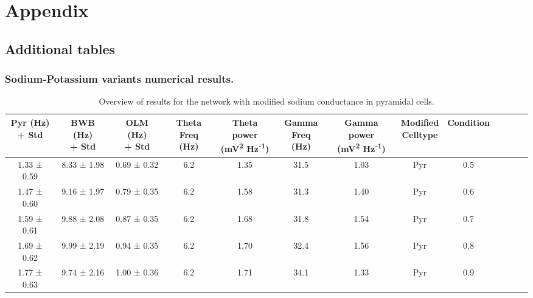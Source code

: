 \chapter{Appendix}\label{ch:appendix_b}

\section{Additional tables}
\subsection{Sodium-Potassium variants numerical results.}
\begin{table}[htbp]
    \caption[Sodium variant: Pyramidal cell]{Overview of results for the network with modified sodium conductance in pyramidal cells.}\label{table:NA_variant_pyr}
    \begin{adjustbox}{width=\textwidth}
        \begin{tabular}{ccccccccccccc}
            \hline
            \CellWithForcedBreak{Pyr (Hz)                                                  \\ + Std} & \CellWithForcedBreak{BWB (Hz) \\ + Std} & \CellWithForcedBreak{OLM (Hz) \\ + Std} & \CellWithForcedBreak{Theta \\ Freq (Hz)} & \CellWithForcedBreak{Theta power \\ (mV\textsuperscript{2} Hz\textsuperscript{-1})} & \CellWithForcedBreak{Gamma \\ Freq (Hz)} & \CellWithForcedBreak{Gamma power \\ (mV\textsuperscript{2} Hz\textsuperscript{-1})} & \CellWithForcedBreak{Modified \\ Celltype} & Condition \\
            \hline
            1.33 ± 0.59 & 8.33 ± 1.98 & 0.69 ± 0.32 & 6.2 & 1.35 & 31.5 & 1.03 & Pyr & 0.5 \\
            1.47 ± 0.60 & 9.16 ± 1.97 & 0.79 ± 0.35 & 6.2 & 1.58 & 31.3 & 1.40 & Pyr & 0.6 \\
            1.59 ± 0.61 & 9.88 ± 2.08 & 0.87 ± 0.35 & 6.2 & 1.68 & 31.8 & 1.54 & Pyr & 0.7 \\
            1.69 ± 0.62 & 9.99 ± 2.19 & 0.94 ± 0.35 & 6.2 & 1.70 & 32.4 & 1.56 & Pyr & 0.8 \\
            1.77 ± 0.63 & 9.74 ± 2.16 & 1.00 ± 0.36 & 6.2 & 1.71 & 34.1 & 1.33 & Pyr & 0.9 \\

\end{tabular}
\end{adjustbox}
\end{table}
